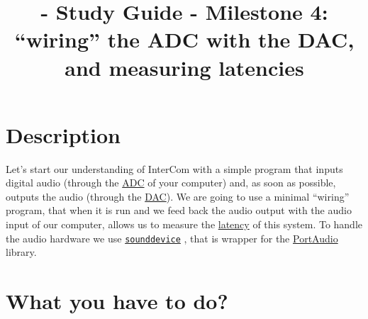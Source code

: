 
\title{\TM{} - Study Guide - Milestone 4: ``wiring'' the ADC with the DAC, and measuring latencies}

\maketitle

\section{Description}

Let's start our understanding of InterCom with a simple program that
inputs digital audio (through the
\href{https://en.wikipedia.org/wiki/Analog-to-digital_converter}{ADC}
of your computer) and, as soon as possible, outputs the audio (through
the
\href{https://en.wikipedia.org/wiki/Digital-to-analog_converter}{DAC}). We
are going to use a minimal ``wiring'' program, that when it is run and
we feed back the audio output with the audio input of our computer,
allows us to measure the
\href{https://en.wikipedia.org/wiki/Latency_(engineering)}{latency} of
this system. To handle the audio hardware we use
\href{https://python-sounddevice.readthedocs.io}{\texttt{sounddevice}}
\cite{sounddevice}, that is wrapper for the
\href{http://www.portaudio.com/}{PortAudio} library.

\section{What you have to do?}

